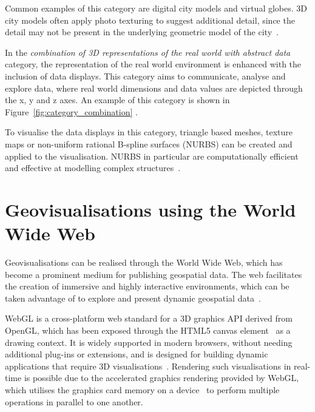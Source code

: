 {	Common examples of this category are digital city models and virtual globes. 3D city models often apply photo texturing to suggest additional detail, since the detail may not be present in the underlying geometric model of the city~\parencite{bleisch2012geovisualization}.

	In the \emph{combination of 3D representations of the real world with abstract data} category, the representation of the real world environment is enhanced with the inclusion of data displays. This category aims to communicate, analyse and explore data, where real world dimensions and data values are depicted through the x, y and z axes. An example of this category is shown in Figure~\ref{fig:category_combination} \parencite{bleisch2012geovisualization}.

	To visualise the data displays in this category, triangle based meshes, texture maps or non-uniform rational B-spline surfaces (NURBS) can be created and applied to the visualisation. NURBS in particular are computationally efficient and effective at modelling complex structures~\parencite{hildebrandt2011image, zhong2006enhanced}.

}

\section{Geovisualisations using the World Wide Web} {

	Geovisualisations can be realised through the World Wide Web, which has become a prominent medium for publishing geospatial data. The web facilitates the creation of immersive and highly interactive environments, which can be taken advantage of to explore and present dynamic geospatial data~\parencite{maceachren2001research}.

	WebGL is a cross-platform web standard for a 3D graphics API derived from OpenGL, which has been exposed through the HTML5 canvas element~\parencite{marrin2011webgl} as a drawing context. It is widely supported in modern browsers, without needing additional plug-ins or extensions, and is designed for building dynamic applications that require 3D visualisations~\parencite{chaturvedi2015web, marrin2011webgl, parisi2012webgl}. Rendering such visualisations in real-time is possible due to the accelerated graphics rendering provided by WebGL, which utilises the graphics card memory on a device~\parencite{chaturvedi2015web} to perform multiple operations in parallel to one another.

}

